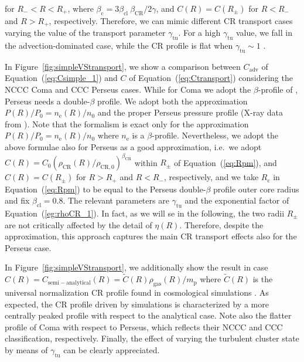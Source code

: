 \documentclass[traditabstract]{aa}
\newcommand{\rmn}{\mathrm}
\begin{document}
\begin{appendix}
for $R_{-}<R<R_{+}$, where $\beta_{\rmn{c}}=3\beta_{\rmn{cl}}~\beta_{\rmn{CR}}/2\gamma$, 
and $C(R) = C(R_{\pm})$ for $R<R_{-}$ and $R>R_{+}$, respectively. Therefore, we can 
mimic different CR transport cases varying the value of the transport parameter 
$\gamma_{\rmn{tu}}$. For a high $\gamma_{\rmn{tu}}$ value, we fall in the 
advection-dominated case, while the CR profile is flat when $\gamma_{\rmn{tu}} \sim1$ \citep{2011A&A...527A..99E}. 

In Figure~\ref{fig:simpleVStransport}, we show a comparison between $C_{\rmn{adv}}$ of 
Equation~(\ref{eq:Csimple_1}) and $C$ of Equation~(\ref{eq:Ctransport}) considering the 
NCCC Coma and CCC Perseus cases. While for Coma we adopt the $\beta$-profile of 
\citet{1992A&A...259L..31B}, Perseus needs a double-$\beta$ profile. We adopt both the 
approximation $P(R)/P_{0}=n_{\rmn{e}}(R)/n_{0}$ and the proper Perseus pressure profile 
(X-ray data from \citealp{2003ApJ...590..225C}). Note that the \cite{2011A&A...527A..99E} 
formalism is exact only for the approximation $P(R)/P_{0}=n_{\rmn{e}}(R)/n_{0}$ where $n_{\rmn{e}}$ 
is a $\beta$-profile. Nevertheless, we adopt the above formulae also for Perseus as a good approximation, 
i.e.~we adopt $C(R)=C_{0}(\rho_{\rmn{CR}}(R)/\rho_{\rmn{CR},0})^{\beta_{\rmn{CR}}}$
within $R_{\pm}$ of Equation~(\ref{eq:Rpm}), and $C(R) = C(R_{\pm})$ for $R > R_{+}$ 
and $R < R_{-}$, respectively, and we take $R_{\rmn{c}}$ in Equation~(\ref{eq:Rpm}) to be equal to the Perseus 
double-$\beta$ profile outer core radius and fix $\beta_{\rmn{cl}}=0.8$. The relevant 
parameters are $\gamma_{\rmn{tu}}$ and the exponential factor of Equation~(\ref{eg:rhoCR_1}). 
In fact, as we will se in the following, the two radii $R_{\pm}$ are not critically affected 
by the detail of $\eta(R)$. Therefore, despite the approximation, this approach captures the 
main CR transport effects also for the Perseus case. 

In Figure~\ref{fig:simpleVStransport}, we additionally show the result in case 
$C(R)=C_{\rmn{semi-analytical}}(R)=\tilde{C}(R)\rho_{\rmn{\rmn{gas}}}(R)/m_{\rmn{p}}$ 
where $\tilde{C}(R)$ is the universal normalization CR profile found in cosmological 
simulations \citep{2010MNRAS.409..449P}. As expected, the CR profile driven by 
simulations is characterized by a more centrally peaked profile with respect to the 
analytical case. Note also the flatter profile of Coma with respect to Perseus, which 
reflects their NCCC and CCC classification, respectively. Finally, the effect of varying 
the turbulent cluster state by means of $\gamma_{\rmn{tu}}$ can be clearly appreciated.


\end{appendix}
\end{document}
